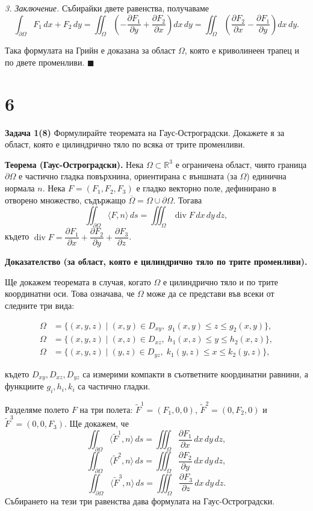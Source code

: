 \documentclass[10pt]{article}
\begin{document}
\textit{3. Заключение.} 
Събирайки двете равенства, получаваме
\[
\int_{\partial\Omega} F_1\,dx + F_2\,dy = \iint_{\Omega} \left( -\frac{\partial F_1}{\partial y} + \frac{\partial F_2}{\partial x} \right) dx\,dy = \iint_{\Omega} \left( \frac{\partial F_2}{\partial x} - \frac{\partial F_1}{\partial y} \right) dx\,dy.
\]

Така формулата на Грийн е доказана за област $\Omega$, която е криволинеен трапец и по двете променливи. $\blacksquare$


\section*{6}

\textbf{Задача 1(8) }Формулирайте теоремата на Гаус-Остроградски. Докажете я за област, която е цилиндрично тяло по всяка от трите променливи.


\textbf{Теорема (Гаус-Остроградски).} 
Нека $\Omega \subset \mathbb{R}^3$ е ограничена област, чиято граница $\partial\Omega$ е частично гладка повърхнина, ориентирана с външната (за $\Omega$) единична нормала $n$. Нека $F = (F_1, F_2, F_3)$ е гладко векторно поле, дефинирано в отворено множество, съдържащо $\overline{\Omega} = \Omega \cup \partial\Omega$. Тогава
\[
\iint_{\partial\Omega} \langle F, n \rangle \,ds = \iiint_{\Omega} \operatorname{div} F \,dx\,dy\,dz,
\]
където $\operatorname{div} F = \dfrac{\partial F_1}{\partial x} + \dfrac{\partial F_2}{\partial y} + \dfrac{\partial F_3}{\partial z}$.

\textbf{Доказателство (за област, която е цилиндрично тяло по трите променливи).}

Ще докажем теоремата в случая, когато $\Omega$ е цилиндрично тяло и по трите координатни оси. Това означава, че $\Omega$ може да се представи във всеки от следните три вида:

\begin{align*}
\Omega &= \{(x,y,z) \mid (x,y) \in D_{xy},\; g_1(x,y) \le z \le g_2(x,y)\}, \\
\Omega &= \{(x,y,z) \mid (x,z) \in D_{xz},\; h_1(x,z) \le y \le h_2(x,z)\}, \\
\Omega &= \{(x,y,z) \mid (y,z) \in D_{yz},\; k_1(y,z) \le x \le k_2(y,z)\},
\end{align*}

където $D_{xy}, D_{xz}, D_{yz}$ са измерими компакти в съответните координатни равнини, а функциите $g_i, h_i, k_i$ са частично гладки.

Разделяме полето $F$ на три полета: $\tilde{F}^1 = (F_1,0,0)$, $\tilde{F}^2 = (0,F_2,0)$ и $\tilde{F}^3 = (0,0,F_3)$. Ще докажем, че
\[
\iint_{\partial\Omega} \langle \tilde{F}^1, n \rangle \,ds = \iiint_{\Omega} \frac{\partial F_1}{\partial x} \,dx\,dy\,dz,
\]
\[
\iint_{\partial\Omega} \langle \tilde{F}^2, n \rangle \,ds = \iiint_{\Omega} \frac{\partial F_2}{\partial y} \,dx\,dy\,dz,
\]
\[
\iint_{\partial\Omega} \langle \tilde{F}^3, n \rangle \,ds = \iiint_{\Omega} \frac{\partial F_3}{\partial z} \,dx\,dy\,dz.
\]
Събирането на тези три равенства дава формулата на Гаус-Остроградски.
\end{document}
